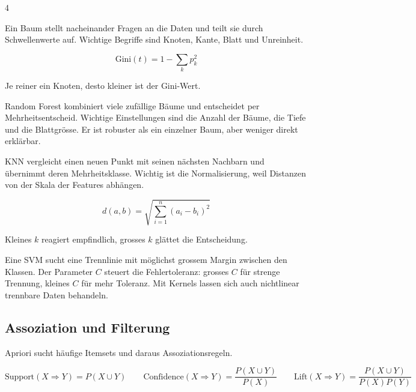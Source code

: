 \begin{landscape}
\begin{multicols*}{4}
\begin{cheatSheetBox}[title=Entscheidungsbaum]
Ein Baum stellt nacheinander Fragen an die Daten und teilt sie durch Schwellenwerte auf.
Wichtige Begriffe sind Knoten, Kante, Blatt und Unreinheit.

\[
\text{Gini}(t)=1-\sum_k p_k^2
\]

Je reiner ein Knoten, desto kleiner ist der Gini-Wert.
\end{cheatSheetBox}

\begin{cheatSheetBox}[title=Random Forest]
Random Forest kombiniert viele zufällige Bäume und entscheidet per Mehrheitsentscheid.
Wichtige Einstellungen sind die Anzahl der Bäume, die Tiefe und die Blattgrösse.
Er ist robuster als ein einzelner Baum, aber weniger direkt erklärbar.
\end{cheatSheetBox}

\begin{cheatSheetBox}[title=KNN]
KNN vergleicht einen neuen Punkt mit seinen nächsten Nachbarn und übernimmt deren Mehrheitsklasse.
Wichtig ist die Normalisierung, weil Distanzen von der Skala der Features abhängen.

\[
d(a,b)=\sqrt{\sum_{i=1}^{n}(a_i-b_i)^2}
\]

Kleines $k$ reagiert empfindlich, grosses $k$ glättet die Entscheidung.
\end{cheatSheetBox}

\begin{cheatSheetBox}[title=SVM als Bonus]
Eine SVM sucht eine Trennlinie mit möglichst grossem Margin zwischen den Klassen.
Der Parameter $C$ steuert die Fehlertoleranz: grosses $C$ für strenge Trennung, kleines $C$ für mehr Toleranz.
Mit Kernels lassen sich auch nichtlinear trennbare Daten behandeln.
\end{cheatSheetBox}

\columnbreak\textcolor{\cheatSheetColor}{\subsection*{Assoziation und Filterung}}

\begin{cheatSheetBox}[title=Apriori]
Apriori sucht häufige Itemsets und daraus Assoziationsregeln.

\[
\text{Support}(X\Rightarrow Y)=P(X\cup Y)
\qquad
\text{Confidence}(X\Rightarrow Y)=\frac{P(X\cup Y)}{P(X)}
\qquad
\text{Lift}(X\Rightarrow Y)=\frac{P(X\cup Y)}{P(X)P(Y)}
\]


\end{cheatSheetBox}
\end{multicols*}
\end{landscape}
